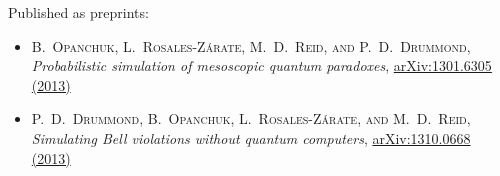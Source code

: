 Published as preprints:

\begin{itemize}
\item[\hfleuron] \textsc{B.~Opanchuk, L.~Rosales-Z\'arate, M.~D.~Reid, \textnormal{and} P.~D.~Drummond}, \textit{Probabilistic simulation of mesoscopic quantum paradoxes}, \href{http://arxiv.org/abs/1301.6305}{arXiv:1301.6305 (2013)}

\item[\hfleuron] \textsc{P.~D.~Drummond, B.~Opanchuk, L.~Rosales-Z\'arate, \textnormal{and} M.~D.~Reid}, \textit{Simulating Bell violations without quantum computers}, \href{http://arxiv.org/abs/1310.0668}{arXiv:1310.0668 (2013)}
\end{itemize}
